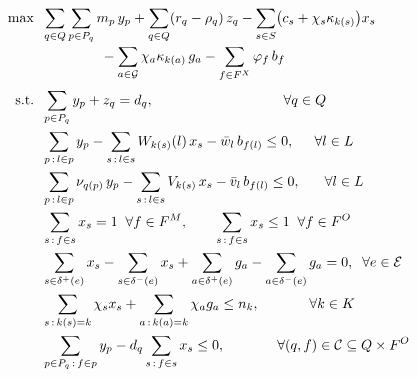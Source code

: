 \documentclass[11pt]{article}
\begin{document}
\begin{align}
\max\;\; & \sum_{q\in Q}\sum_{p\in P_q} m_p\,y_p
  + \sum_{q\in Q}(r_q-\rho_q)\,z_q
  - \sum_{s\in S}\bigl(c_s+\chi_s\kappa_{k(s)}\bigr)x_s
  \notag\\[-2pt]
& \hspace{4.2em}
  - \sum_{a\in\mathcal{G}}\chi_a\kappa_{k(a)}\,g_a
  - \sum_{f\in F^{X}}\varphi_f\,b_f
  \label{eq:obj}\\[2pt]
\text{s.t.}\;\;
& \sum_{p\in P_q} y_p + z_q = d_q,
  \qquad\qquad\qquad\qquad\quad\; \forall q\in Q
  \label{eq:demand}\\
& \sum_{p\,:\,l\in p} y_p - \sum_{s\,:\,l\in s} W_{k(s)}(l)\,x_s
  - \bar w_l\, b_{f(l)} \le 0,
  \quad\;\, \forall l\in L
  \label{eq:legw}\\
& \sum_{p\,:\,l\in p} \nu_{q(p)}\,y_p - \sum_{s\,:\,l\in s} V_{k(s)}\,x_s
  - \bar v_l\, b_{f(l)} \le 0,
  \quad\;\;\, \forall l\in L
  \label{eq:legv}\\
& \sum_{s\,:\,f\in s} x_s = 1 \;\;\forall f\in F^{M},
  \qquad
  \sum_{s\,:\,f\in s} x_s \le 1 \;\;\forall f\in F^{O}
  \label{eq:cover}\\
& \sum_{s\in\delta^{+}(e)} x_s - \sum_{s\in\delta^{-}(e)} x_s
  + \sum_{a\in\delta^{+}(e)} g_a - \sum_{a\in\delta^{-}(e)} g_a = 0,
  \;\; \forall e\in\mathcal{E}
  \label{eq:balance}\\
& \sum_{s\,:\,k(s)=k}\chi_s x_s + \sum_{a\,:\,k(a)=k}\chi_a g_a \le n_k,
  \qquad\quad\;\; \forall k\in K
  \label{eq:fleet}\\
& \sum_{p\in P_q\,:\,f\in p} y_p - d_q \sum_{s\,:\,f\in s} x_s \le 0,
  \qquad\quad\;\;\, \forall (q,f)\in \mathcal{C}\subseteq Q\times F^{O}
  \label{eq:ibc}
\end{align}
\end{document}
